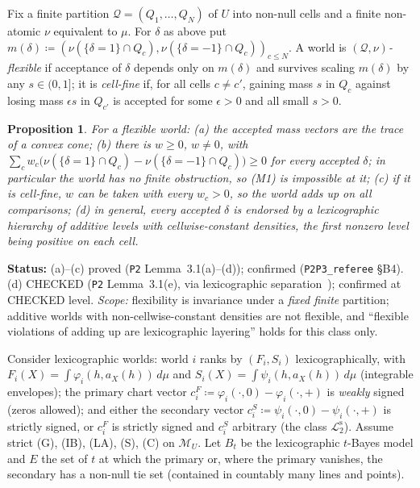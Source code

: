 \documentclass[11pt]{article}
\newtheorem{proposition}[theorem]{Proposition}
\theoremstyle{definition}
\theoremstyle{remark}
\newcommand{\M}{\mathcal M}
\newcommand{\src}[1]{\texttt{#1}}
\newcommand{\status}[1]{\par\smallskip\noindent\textbf{Status:} #1\par\smallskip}
\newcommand{\Ltwo}{\mathcal L_2^{\mathrm s}}
\begin{document}
Fix a finite partition $\mathcal Q=(Q_1,\dots,Q_N)$ of $U$ into non-null cells and a finite non-atomic $\nu$ equivalent to $\mu$. For $\delta$ as above put $m(\delta)\coloneqq(\nu(\{\delta=1\}\cap Q_c),\nu(\{\delta=-1\}\cap Q_c))_{c\le N}$. A world is \emph{$(\mathcal Q,\nu)$-flexible} if acceptance of $\delta$ depends only on $m(\delta)$ and survives scaling $m(\delta)$ by any $s\in(0,1]$; it is \emph{cell-fine} if, for all cells $c\ne c'$, gaining mass $s$ in $Q_c$ against losing mass $\epsilon s$ in $Q_{c'}$ is accepted for some $\epsilon>0$ and all small $s>0$.

\begin{proposition}\label{prop:flexible}
For a flexible world: (a) the accepted mass vectors are the trace of a convex cone; (b) there is $w\ge0$, $w\ne0$, with $\sum_cw_c\bigl(\nu(\{\delta=1\}\cap Q_c)-\nu(\{\delta=-1\}\cap Q_c)\bigr)\ge0$ for every accepted $\delta$; in particular the world has no finite obstruction, so (M1) is impossible at it; (c) if it is cell-fine, $w$ can be taken with every $w_c>0$, so the world adds up on all comparisons; (d) in general, every accepted $\delta$ is endorsed by a lexicographic hierarchy of additive levels with cellwise-constant densities, the first nonzero level being positive on each cell.
\end{proposition}
\status{(a)--(c) proved (\src{P2} Lemma~3.1(a)--(d)); confirmed (\src{P2P3\_referee} \S B4). (d) CHECKED (\src{P2} Lemma~3.1(e), via lexicographic separation~\cite{MLS1987}); confirmed at CHECKED level. \emph{Scope:} flexibility is invariance under a \emph{fixed finite} partition; additive worlds with non-cellwise-constant densities are not flexible, and ``flexible violations of adding up are lexicographic layering'' holds for this class only.}

Consider lexicographic worlds: world $i$ ranks by $(F_i,S_i)$ lexicographically, with $F_i(X)=\int\varphi_i(h,a_X(h))\,d\mu$ and $S_i(X)=\int\psi_i(h,a_X(h))\,d\mu$ (integrable envelopes); the primary chart vector $c^F_i\coloneqq\varphi_i(\cdot,0)-\varphi_i(\cdot,+)$ is \emph{weakly} signed (zeros allowed); and either the secondary vector $c^S_i\coloneqq\psi_i(\cdot,0)-\psi_i(\cdot,+)$ is strictly signed, or $c^F_i$ is strictly signed and $c^S_i$ arbitrary (the class $\Ltwo$). Assume strict (G), (IB), (LA), (S), (C) on $\M_U$. Let $B_t$ be the lexicographic $t$-Bayes model and $E$ the set of $t$ at which the primary or, where the primary vanishes, the secondary has a non-null tie set (contained in countably many lines and points).
\end{document}
